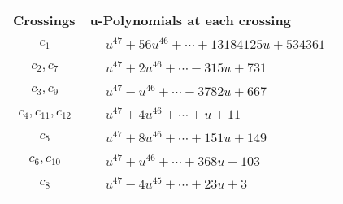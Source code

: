 \documentclass[1p]{elsarticle_modified}
\theoremstyle{definition}
\begin{document}
\begin{tabular}{m{50pt}|m{274pt}}
Crossings & \hspace{64pt}u-Polynomials at each crossing \\
\hline $$\begin{aligned}c_{1}\end{aligned}$$&$\begin{aligned}
&u^{47}+56 u^{46}+\cdots+13184125 u+534361
\end{aligned}$\\
\hline $$\begin{aligned}c_{2},c_{7}\end{aligned}$$&$\begin{aligned}
&u^{47}+2 u^{46}+\cdots-315 u+731
\end{aligned}$\\
\hline $$\begin{aligned}c_{3},c_{9}\end{aligned}$$&$\begin{aligned}
&u^{47}- u^{46}+\cdots-3782 u+667
\end{aligned}$\\
\hline $$\begin{aligned}c_{4},c_{11},c_{12}\end{aligned}$$&$\begin{aligned}
&u^{47}+4 u^{46}+\cdots+u+11
\end{aligned}$\\
\hline $$\begin{aligned}c_{5}\end{aligned}$$&$\begin{aligned}
&u^{47}+8 u^{46}+\cdots+151 u+149
\end{aligned}$\\
\hline $$\begin{aligned}c_{6},c_{10}\end{aligned}$$&$\begin{aligned}
&u^{47}+u^{46}+\cdots+368 u-103
\end{aligned}$\\
\hline $$\begin{aligned}c_{8}\end{aligned}$$&$\begin{aligned}
&u^{47}-4 u^{45}+\cdots+23 u+3
\end{aligned}$\\
\hline
\end{tabular}\\~\\
\newpage\renewcommand{\arraystretch}{1}
\end{document}
